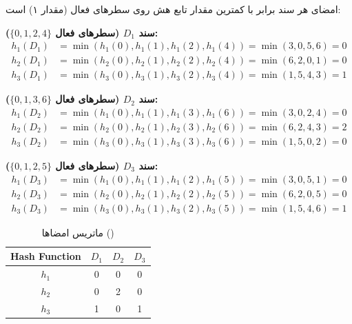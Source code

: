 \documentclass[11pt,a4paper]{article}
\begin{document}
	امضای هر سند برابر با کمترین مقدار تابع هش روی سطرهای فعال (مقدار ۱) است:
	
	\begin{tcolorbox}[primarycard, title={محاسبه امضای اسناد $D_1$، $D_2$ و $D_3$}]
		\small
		\textbf{سند $D_1$ (سطرهای فعال $\{0, 1, 2, 4\}$):}
		\begin{align*}
			h_1(D_1) &= \min(h_1(0), h_1(1), h_1(2), h_1(4)) = \min(3, 0, 5, 6) = 0 \\
			h_2(D_1) &= \min(h_2(0), h_2(1), h_2(2), h_2(4)) = \min(6, 2, 0, 1) = 0 \\
			h_3(D_1) &= \min(h_3(0), h_3(1), h_3(2), h_3(4)) = \min(1, 5, 4, 3) = 1
		\end{align*}
		
		\vspace{0.1cm}
		\textbf{سند $D_2$ (سطرهای فعال $\{0, 1, 3, 6\}$):}
		\begin{align*}
			h_1(D_2) &= \min(h_1(0), h_1(1), h_1(3), h_1(6)) = \min(3, 0, 2, 4) = 0 \\
			h_2(D_2) &= \min(h_2(0), h_2(1), h_2(3), h_2(6)) = \min(6, 2, 4, 3) = 2 \\
			h_3(D_2) &= \min(h_3(0), h_3(1), h_3(3), h_3(6)) = \min(1, 5, 0, 2) = 0
		\end{align*}
		
		\vspace{0.1cm}
		\textbf{سند $D_3$ (سطرهای فعال $\{0, 1, 2, 5\}$):}
		\begin{align*}
			h_1(D_3) &= \min(h_1(0), h_1(1), h_1(2), h_1(5)) = \min(3, 0, 5, 1) = 0 \\
			h_2(D_3) &= \min(h_2(0), h_2(1), h_2(2), h_2(5)) = \min(6, 2, 0, 5) = 0 \\
			h_3(D_3) &= \min(h_3(0), h_3(1), h_3(2), h_3(5)) = \min(1, 5, 4, 6) = 1
		\end{align*}
	\end{tcolorbox}
	
	\begin{table}[H]
		\centering
		\small
		\renewcommand{\arraystretch}{1.30}
		\caption{ماتریس امضاها ()}
		\vspace{0.15cm}
		\begin{latin}
			\begin{tabular}{cccc}
				\toprule
				\rowcolor{headerBg}
				\textbf{Hash Function} & $D_1$ & $D_2$ & $D_3$ \\
				\midrule
				$h_1$ & 0 & 0 & 0 \\
				$h_2$ & 0 & 2 & 0 \\
				$h_3$ & 1 & 0 & 1 \\
				\bottomrule
			\end{tabular}
		\end{latin}
	\end{table}
	
\end{document}
